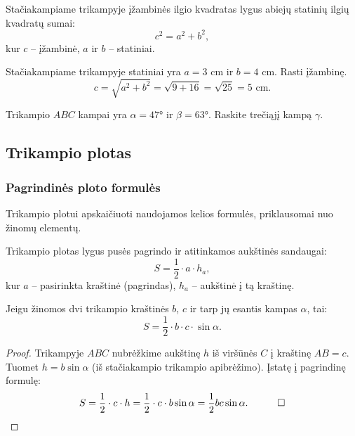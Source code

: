 \begin{theorem}
Stačiakampiame trikampyje įžambinės ilgio kvadratas lygus abiejų statinių ilgių
kvadratų sumai:
\[
c^2 = a^2 + b^2,
\]
kur $c$ – įžambinė, $a$ ir $b$ – statiniai.
\end{theorem}

\begin{example}
Stačiakampiame trikampyje statiniai yra $a = 3$ cm ir $b = 4$ cm. Rasti įžambinę.
\[
c = \sqrt{a^2 + b^2} = \sqrt{9 + 16} = \sqrt{25} = 5 \text{ cm}.
\]
\end{example}

\begin{exercise}
Trikampio $ABC$ kampai yra $\alpha = 47°$ ir $\beta = 63°$. Raskite trečiąjį kampą $\gamma$.
\end{exercise}

\subsection{Trikampio plotas}

\subsubsection*{Pagrindinės ploto formulės}

Trikampio plotui apskaičiuoti naudojamos kelios formulės, priklausomai nuo žinomų elementų.

\begin{theorem}
Trikampio plotas lygus pusės pagrindo ir atitinkamos aukštinės sandaugai:
\[
S = \frac{1}{2} \cdot a \cdot h_a,
\]
kur $a$ – pasirinkta kraštinė (pagrindas), $h_a$ – aukštinė į tą kraštinę.
\end{theorem}

\begin{theorem}
Jeigu žinomos dvi trikampio kraštinės $b$, $c$ ir tarp jų esantis kampas $\alpha$, tai:
\[
\boxed{S = \frac{1}{2} \cdot b \cdot c \cdot \sin\alpha.}
\]
\end{theorem}

\begin{proof}
Trikampyje $ABC$ nubrėžkime aukštinę $h$ iš viršūnės $C$ į kraštinę $AB = c$.
Tuomet $h = b \sin\alpha$ (iš stačiakampio trikampio apibrėžimo).
Įstatę į pagrindinę formulę:
\[
S = \frac{1}{2} \cdot c \cdot h = \frac{1}{2} \cdot c \cdot b\sin\alpha = \frac{1}{2}bc\sin\alpha. \quad \qed
\]
\end{proof}

